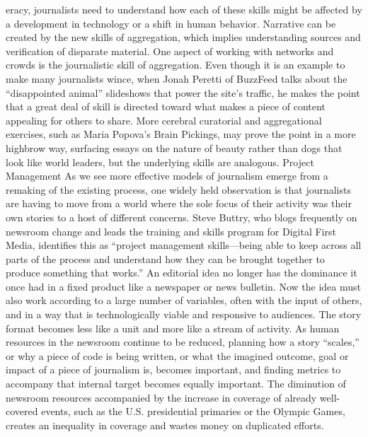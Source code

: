 eracy, journalists need to understand how each of these skills might be affected
by a development in technology or a shift in human behavior. Narrative can be
created by the new skills of aggregation, which implies understanding sources
and verification of disparate material. One aspect of working with networks and
crowds is the journalistic skill of aggregation.
Even though it is an example to make many journalists wince, when Jonah Peretti
of BuzzFeed talks about the ``disappointed animal'' slideshows that power the site’s
traffic, he makes the point that a great deal of skill is directed toward what makes a
piece of content appealing for others to share. More cerebral curatorial and aggregational
exercises, such as Maria Popova’s Brain Pickings, may prove the point in a
more highbrow way, surfacing essays on the nature of beauty rather than dogs that
look like world leaders, but the underlying skills are analogous.
Project Management
As we see more effective models of journalism emerge from a remaking of the
existing process, one widely held observation is that journalists are having to
move from a world where the sole focus of their activity was their own stories
to a host of different concerns. Steve Buttry, who blogs frequently on newsroom
change and leads the training and skills program for Digital First Media, identifies
this as ``project management skills—being able to keep across all parts of the
process and understand how they can be brought together to produce something
that works.''
An editorial idea no longer has the dominance it once had in a fixed product like
a newspaper or news bulletin. Now the idea must also work according to a large
number of variables, often with the input of others, and in a way that is technologically
viable and responsive to audiences. The story format becomes less like a unit
and more like a stream of activity. As human resources in the newsroom continue to
be reduced, planning how a story ``scales,'' or why a piece of code is being written,
or what the imagined outcome, goal or impact of a piece of journalism is, becomes
important, and finding metrics to accompany that internal target becomes equally
important. The diminution of newsroom resources accompanied by the increase
in coverage of already well-covered events, such as the U.S. presidential primaries
or the Olympic Games, creates an inequality in coverage and wastes money on
duplicated efforts.

